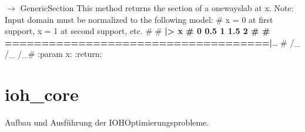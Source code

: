 \documentclass[a4paper,11pt,german]{sphinxmanual}
\begin{document}
\begin{fulllineitems}
\begin{fulllineitems}
\label{\detokenize{api/slab_construction:slab_construction.slabs.one_way_slab.OneWaySlab.B}}
\pysigstartsignatures
\pysigline
{}
\pysigstopsignatures
\end{fulllineitems}


\begin{fulllineitems}
\label{\detokenize{api/slab_construction:slab_construction.slabs.one_way_slab.OneWaySlab.section_at}}
\pysigstartsignatures
\pysiglinewithargsret
{}
{}
{{ $\rightarrow$ GenericSection}}
\pysigstopsignatures
\sphinxAtStartPar
This method returns the section of a one\sphinxhyphen{}way\sphinxhyphen{}slab at x.
Note: Input domain must be normalized to the following model:
\# x = 0 at first support, x = 1 at second support, etc.
\#
\#   {\color{red}\bfseries{}|\sphinxhyphen{}> x
\#   0      0.5      1      1.5      2
\#
\#   ====================================|}…
\#  /\_            /\_            /\_\#
:param x:
:return:

\end{fulllineitems}


\end{fulllineitems}


\sphinxstepscope


\chapter{ioh\_core}
\label{\detokenize{api/ioh_core:ioh-core}}\label{\detokenize{api/ioh_core::doc}}
\sphinxAtStartPar
Aufbau und Ausführung der IOH\sphinxhyphen{}Optimierungsprobleme.
\end{document}

